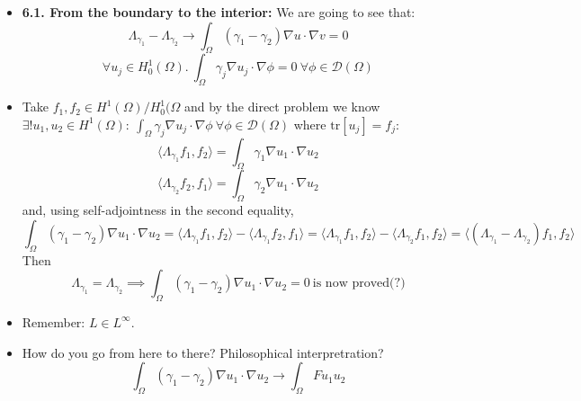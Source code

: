 \documentclass{article}
\begin{document}
\begin{itemize}
    \item \textbf{6.1. From the boundary to the interior:} We are going to see that:
    \begin{equation}
        \Lambda_{\gamma_1} - \Lambda_{\gamma_2} \rightarrow \int_\Omega (\gamma_1 - \gamma_2) \nabla u \cdot \nabla v = 0
    \end{equation}
    \begin{equation}
        \forall u_j  \in H^1_0(\Omega). \ \int_\Omega \gamma_j \nabla u_j \cdot \nabla \phi = 0 \ \forall \phi \in \mathcal{D}(\Omega)
    \end{equation}

    \item Take $f_1, f_2 \in H^1(\Omega)/H^1_0(\Omega$ and by the direct problem  we know $\exists! u_1, u_2\in H^1(\Omega): \ \int_\Omega \gamma_j \nabla u_j \cdot \nabla \phi \ \forall \phi \in \mathcal{D}(\Omega)$ where $\text{tr} [u_j] = f_j$:
    \begin{equation}
        \langle \Lambda_{\gamma_1} f_1, f_2 \rangle = \int_\Omega \gamma_1 \nabla u_1 \cdot \nabla u_2
    \end{equation}
    \begin{equation}
        \langle \Lambda_{\gamma_2} f_2, f_1 \rangle = \int_\Omega \gamma_2 \nabla u_1 \cdot \nabla u_2
    \end{equation}
    and, using self-adjointness in the second equality,
    \begin{equation}
        \int_\Omega (\gamma_1 - \gamma_2) \nabla u_1 \cdot \nabla u_2 = \langle \Lambda_{\gamma_1} f_1, f_2 \rangle - \langle \Lambda_{\gamma_1} f_2, f_1 \rangle =  \langle \Lambda_{\gamma_1} f_1, f_2 \rangle - \langle \Lambda_{\gamma_2} f_1, f_2 \rangle = \langle (\Lambda_{\gamma_1} - \Lambda_{\gamma_2}) f_1, f_2 \rangle
    \end{equation}
    Then
    \begin{equation}
        \Lambda_{\gamma_1} = \Lambda_{\gamma_2} \implies \int_\Omega (\gamma_1 - \gamma_2) \nabla u_1 \cdot \nabla u_2 = 0 \ \text{is now proved(?)}
    \end{equation}

    \item Remember: $L \in L^\infty$.

    \item How do you go from here to there? Philosophical interpretration?
    \begin{equation}
        \int_\Omega (\gamma_1 - \gamma_2) \nabla u_1 \cdot \nabla u_2 \longrightarrow \int_\Omega F u_1 u_2
    \end{equation}


\end{itemize}
\end{document}
